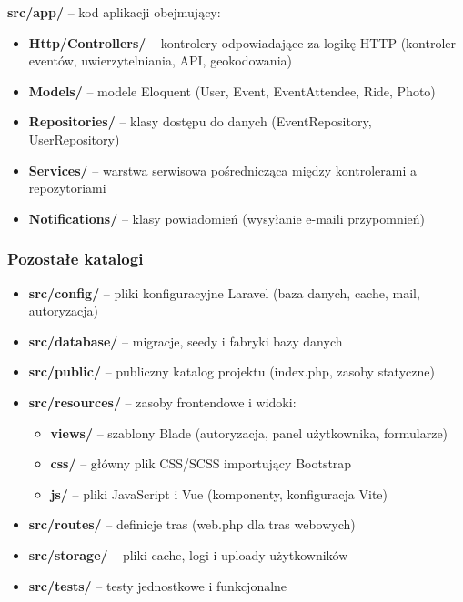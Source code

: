 \documentclass[12pt,a4paper]{article}
\begin{document}
\textbf{src/app/} -- kod aplikacji obejmujący:
\begin{itemize}[itemsep=1pt]
    \item \textbf{Http/Controllers/} -- kontrolery odpowiadające za logikę HTTP (kontroler eventów, uwierzytelniania, API, geokodowania)
    \item \textbf{Models/} -- modele Eloquent (User, Event, EventAttendee, Ride, Photo)
    \item \textbf{Repositories/} -- klasy dostępu do danych (EventRepository, UserRepository)
    \item \textbf{Services/} -- warstwa serwisowa pośrednicząca między kontrolerami a repozytoriami
    \item \textbf{Notifications/} -- klasy powiadomień (wysyłanie e-maili przypomnień)
\end{itemize}

\subsubsection{Pozostałe katalogi}

\begin{itemize}[itemsep=2pt]
    \item \textbf{src/config/} -- pliki konfiguracyjne Laravel (baza danych, cache, mail, autoryzacja)
    
    \item \textbf{src/database/} -- migracje, seedy i fabryki bazy danych
    
    \item \textbf{src/public/} -- publiczny katalog projektu (index.php, zasoby statyczne)
    
    \item \textbf{src/resources/} -- zasoby frontendowe i widoki:
    \begin{itemize}[itemsep=1pt]
        \item \textbf{views/} -- szablony Blade (autoryzacja, panel użytkownika, formularze)
        \item \textbf{css/} -- główny plik CSS/SCSS importujący Bootstrap
        \item \textbf{js/} -- pliki JavaScript i Vue (komponenty, konfiguracja Vite)
    \end{itemize}
    
    \item \textbf{src/routes/} -- definicje tras (web.php dla tras webowych)
    
    \item \textbf{src/storage/} -- pliki cache, logi i uploady użytkowników
    
    \item \textbf{src/tests/} -- testy jednostkowe i funkcjonalne
\end{itemize}
\end{document}
